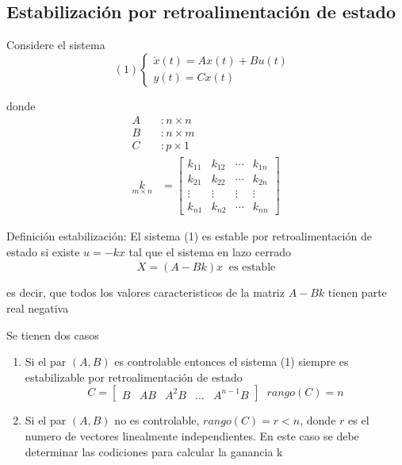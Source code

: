 \subsection{Estabilización por retroalimentación de estado}

Considere el sistema
\[
    (1)
    \left\{
        \begin{array}{lll}
            \dot{x}(t) = Ax(t) + Bu(t)\\
            y(t) = Cx(t)
        \end{array}
    \right. \;\;
\]

donde 
\[
     \begin{split}
        A &: n\times n \\
        B &: n\times m \\
        C &: p \times 1 \\
        \underset{m \times n}{k} & = 
            \begin{bmatrix}
                k_{11} & k_{12} & \cdots & k_{1n} \\
                k_{21} & k_{22} & \cdots & k_{2n} \\
                \vdots & \vdots & \vdots & \vdots \\
                k_{n1} & k_{n2} & \cdots & k_{nn}
            \end{bmatrix}
    \end{split}
\]

Definición estabilización: El sistema (1) es estable por retroalimentación de estado si existe \( u = -kx \) tal que el sistema en lazo cerrado
\[
    \dot{X} = (A-Bk)x \;\; \text{es estable} 
\]

es decir, que todos los valores caracteristicos de la matriz \( A-Bk \) tienen parte real negativa

Se tienen dos casos 
\begin{enumerate}
    \item Si el par \( (A, B) \) es controlable entonces el sistema (1) siempre es estabilizable por retroalimentación de estado
    \[
        C = \begin{bmatrix}
                B & AB & A^{2}B & \ldots & A^{n-1}B
            \end{bmatrix} \;\; rango(C) = n
    \]
    \item Si el par \( (A, B) \) no es controlable, \( rango(C) = r < n \), donde \( r \) es el numero de vectores linealmente independientes. 
    En este caso se debe determinar las codiciones para calcular la ganancia k
\end{enumerate}

